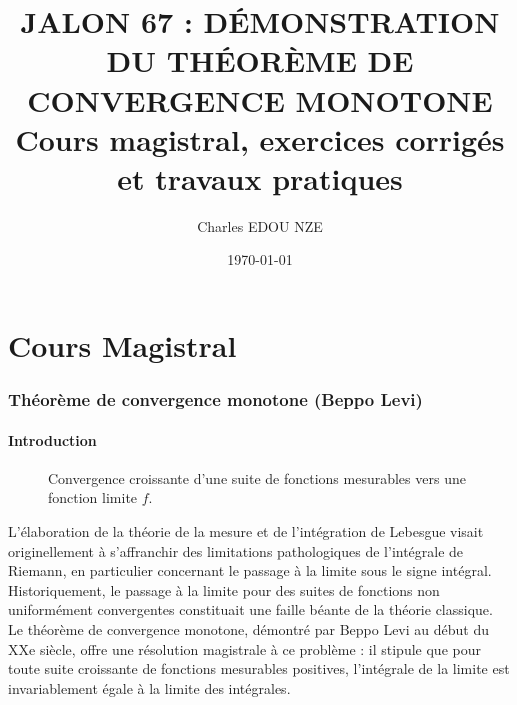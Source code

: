 \documentclass[11pt,a4paper]{article}
\title{\Huge JALON 67 : DÉMONSTRATION DU THÉORÈME DE CONVERGENCE MONOTONE \\ \large Cours magistral, exercices corrigés et travaux pratiques}
\author{\Large Charles EDOU NZE}
\date{\today}
\begin{document}
\maketitle
\tableofcontents
\newpage
\part{Cours Magistral}


\section*{Théorème de convergence monotone (Beppo Levi)}

\subsection*{Introduction}

\begin{figure}[h]
\centering
{}
\caption{Convergence croissante d'une suite de fonctions mesurables vers une fonction limite $f$.}
\end{figure}


L'élaboration de la théorie de la mesure et de l'intégration de Lebesgue visait originellement à s'affranchir des limitations pathologiques de l'intégrale de Riemann, en particulier concernant le passage à la limite sous le signe intégral. Historiquement, le passage à la limite pour des suites de fonctions non uniformément convergentes constituait une faille béante de la théorie classique. Le théorème de convergence monotone, démontré par Beppo Levi au début du XXe siècle, offre une résolution magistrale à ce problème : il stipule que pour toute suite croissante de fonctions mesurables positives, l'intégrale de la limite est invariablement égale à la limite des intégrales.
\end{document}
